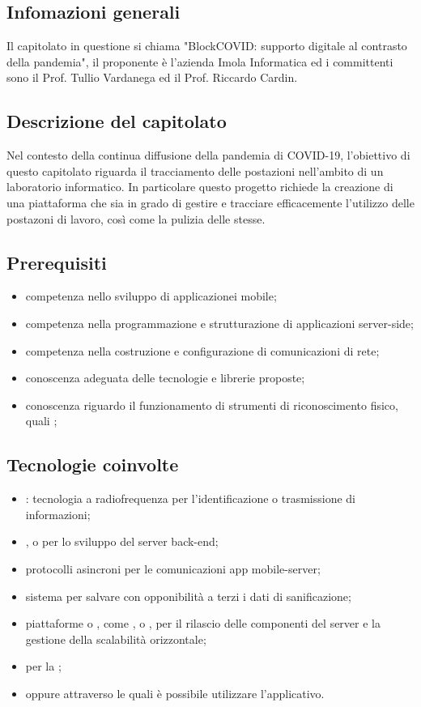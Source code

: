 
\subsection{Infomazioni generali}
Il capitolato in questione si chiama "BlockCOVID: supporto digitale al contrasto della pandemia", il proponente è l'azienda Imola Informatica ed i committenti sono il Prof. Tullio Vardanega ed il Prof. Riccardo Cardin.

\subsection{Descrizione del capitolato}
Nel contesto della continua diffusione della pandemia di COVID-19, l'obiettivo di questo capitolato riguarda il tracciamento delle postazioni nell'ambito di un laboratorio informatico. In particolare questo progetto richiede la creazione di una piattaforma che sia in grado di gestire e tracciare efficacemente l'utilizzo delle postazoni di lavoro, così come la pulizia delle stesse.

\subsection{Prerequisiti}
\begin{itemize}
\item competenza nello sviluppo di applicazionei mobile;
\item competenza nella programmazione e strutturazione di applicazioni server-side;
\item competenza nella costruzione e configurazione di comunicazioni di rete;
\item conoscenza adeguata delle tecnologie e librerie proposte;
\item conoscenza riguardo il funzionamento di strumenti di riconoscimento fisico, quali ;
\end{itemize}

\subsection{Tecnologie coinvolte}
\begin{itemize}
\item {}: tecnologia a radiofrequenza per l'identificazione o trasmissione di informazioni;
\item {},  o  per lo sviluppo del server back-end;
\item protocolli asincroni per le comunicazioni app mobile-server;
\item sistema  per salvare con opponibilità a terzi i dati di sanificazione;
\item piattaforme  o , come ,  o , per il rilascio delle componenti del server e la gestione della scalabilità orizzontale;
\item {} per la ;
\item {} oppure  attraverso le quali è possibile utilizzare l'applicativo.
\end{itemize}

